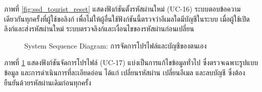 ภาพที่ \ref{fig:ssd_tourist_reset} แสดงฟังก์ชันตั้งรหัสผ่านใหม่ (UC-16) ระบบตอบข้อความเดียวกันทุกครั้งที่ผู้ใช้ขอลิงก์ เพื่อไม่ให้ผู้อื่นใช้ฟังก์ชันนี้ตรวจว่าอีเมลใดมีบัญชีในระบบ เมื่อผู้ใช้เปิดลิงก์และส่งรหัสผ่านใหม่ ระบบตรวจลิงก์และเงื่อนไขของรหัสผ่านก่อนเปลี่ยน

\begin{figure}[H]
\centering
{}
\caption{System Sequence Diagram: การจัดการโปรไฟล์และบัญชีของตนเอง}
\label{fig:ssd_tourist_profile}
\end{figure}

ภาพที่ \ref{fig:ssd_tourist_profile} แสดงฟังก์ชันจัดการโปรไฟล์ (UC-17) แบ่งเป็นการแก้ไขข้อมูลทั่วไป ซึ่งตรวจเฉพาะรูปแบบข้อมูล และการดำเนินการที่ละเอียดอ่อน ได้แก่ เปลี่ยนรหัสผ่าน เปลี่ยนอีเมล และลบบัญชี ซึ่งต้องยืนยันด้วยรหัสผ่านเดิมก่อนทุกครั้ง

